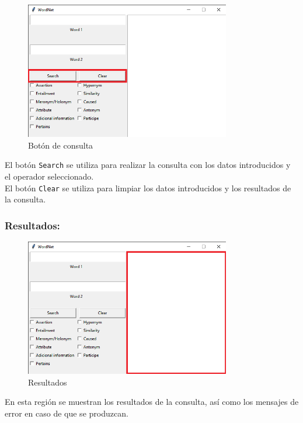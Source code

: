 \documentclass[12pt]{article}
\begin{document}
\begin{figure}[h]
    \centering
    \includegraphics[width=0.8\textwidth]{buttons.png}
    \caption{Botón de consulta}
    \label{fig:buttons}
\end{figure}


El botón \texttt{Search} se utiliza para realizar la consulta con los datos introducidos y el operador seleccionado.\\

El botón \texttt{Clear} se utiliza para limpiar los datos introducidos y los resultados de la consulta.

\newpage

\subsubsection{Resultados:}


\begin{figure}[h]
    \centering
    \includegraphics[width=0.8\textwidth]{text.png}
    \caption{Resultados}
    \label{fig:text}
\end{figure}

En esta región se muestran los resultados de la consulta, así como los mensajes de error en caso de que se produzcan.
\end{document}
